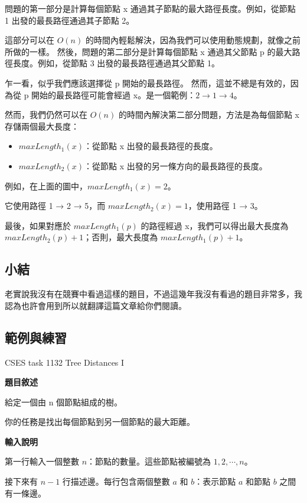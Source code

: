     問題的第一部分是計算每個節點 x 通過其子節點的最大路徑長度。例如，從節點 1 出發的最長路徑通過其子節點 2。

    這部分可以在 $O(n)$ 的時間內輕鬆解決，因為我們可以使用動態規劃，就像之前所做的一樣。
    然後，問題的第二部分是計算每個節點 x 通過其父節點 p 的最大路徑長度。例如，從節點 3 出發的最長路徑通過其父節點 1。

    乍一看，似乎我們應該選擇從 p 開始的最長路徑。
    然而，這並不總是有效的，因為從 p 開始的最長路徑可能會經過 x。是一個範例：$2 \to 1 \to 4$。

    然而，我們仍然可以在 $O(n)$ 的時間內解決第二部分問題，方法是為每個節點 x 存儲兩個最大長度：

    \begin{itemize}
        \item $maxLength_1(x)$：從節點 x 出發的最長路徑的長度。
        \item $maxLength_2(x)$：從節點 x 出發的另一條方向的最長路徑的長度。
    \end{itemize}
    
    例如，在上面的圖中，$maxLength_1(x) = 2$。
    
    它使用路徑 1 → 2 → 5，而 $maxLength_2(x) = 1$，使用路徑 1 → 3。

    最後，如果對應於 $maxLength_1(p)$ 的路徑經過 x，我們可以得出最大長度為 $maxLength_2(p) + 1$；否則，最大長度為 $maxLength_1(p) + 1$。

    \subsection{小結}
    老實說我沒有在競賽中看過這樣的題目，不過這幾年我沒有看過的題目非常多，我認為也許會用到所以就翻譯這篇文章給你們閱讀。

    \subsection{範例與練習}

    \problem CSES task 1132 Tree Distances I 

    \textbf{題目敘述}

    給定一個由 n 個節點組成的樹。
    
    你的任務是找出每個節點到另一個節點的最大距離。

    \textbf{輸入說明}

    第一行輸入一個整數 $n$：節點的數量。這些節點被編號為 $1, 2,\cdots , n$。

    接下來有 $n-1$ 行描述邊。每行包含兩個整數 $a$ 和 $b$：表示節點 $a$ 和節點 $b$ 之間有一條邊。
    
